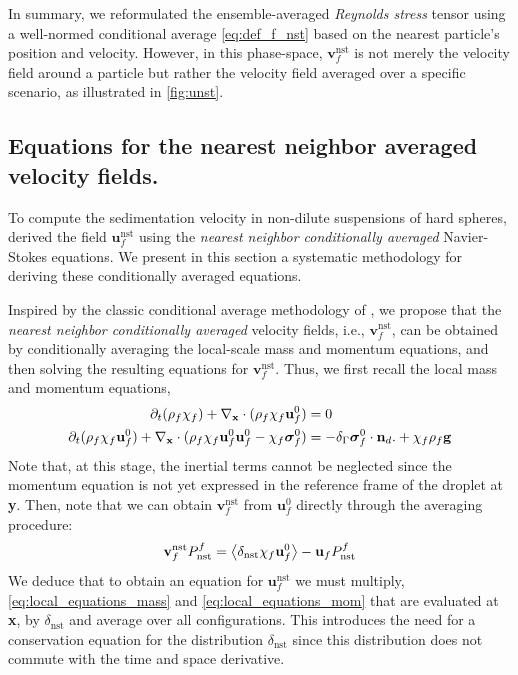 In summary, we reformulated the ensemble-averaged \textit{Reynolds stress} tensor using a well-normed conditional average \eqref{eq:def_f_nst} based on the nearest particle's position and velocity. 
However, in this phase-space, $\textbf{v}_f^\text{nst}$ is not merely the velocity field around a particle but rather the velocity field averaged over a specific scenario, as illustrated in \ref{fig:unst}. 

\subsection{Equations for the nearest neighbor averaged velocity fields. }

To compute the sedimentation velocity in non-dilute suspensions of hard spheres, \citet[Appendix B]{zhang2021ensemble} derived the field $\textbf{u}_f^\text{nst}$ using the \textit{nearest neighbor conditionally averaged} Navier-Stokes equations. 
We present in this section a systematic methodology for deriving these conditionally averaged equations. 

Inspired by the classic conditional average methodology of \citet{hinch1977averaged}, we propose that the \textit{nearest neighbor conditionally averaged} velocity fields, i.e., $\textbf{v}_f^\text{nst}$, can be obtained by conditionally averaging the local-scale mass and momentum equations, and then solving the resulting equations for $\textbf{v}_f^\text{nst}$. 
Thus, we first recall the local mass and momentum equations, 
\begin{align}
    \pddt (\rho_f\chi_f) +  \pddx \cdot (\rho_f\chi_f\textbf{u}^0_f) &= 0 
    \label{eq:local_equations_mass}
    \\
    \pddt (\rho_f\chi_f\textbf{u}^0_f)
    + \pddx\cdot (\rho_f\chi_f\textbf{u}^0_f\textbf{u}^0_f - \chi_f\bm\sigma^0_f)
    &= 
    - \delta_\Gamma \bm\sigma_f^0 \cdot \textbf{n}_d. 
    + \chi_f \rho_f \textbf{g}
    \label{eq:local_equations_mom}
\end{align}
Note that, at this stage, the inertial terms cannot be neglected since the momentum equation is not yet expressed in the reference frame of the droplet at \textbf{y}. 
Then, note that we can obtain $\textbf{v}_f^\text{nst}$ from $\textbf{u}_f^0$ directly through the averaging procedure: 
\begin{equation}
    \textbf{v}_f^\text{nst} P_\text{nst}^f
    = 
    \left<\delta_\text{nst} \chi_f \textbf{u}_f^0\right>
    - \textbf{u}_f P_\text{nst}^f
\end{equation}
We deduce that to obtain an equation for $\textbf{u}_f^\text{nst}$ we must multiply, \ref{eq:local_equations_mass} and \ref{eq:local_equations_mom} that are evaluated at \textbf{x}, by $\delta_\text{nst}$ and average over all configurations. 
This introduces the need for a conservation equation for the distribution $\delta_\text{nst}$ since this distribution does not commute with the time and space derivative. 

